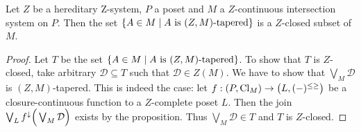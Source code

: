 \begin{corollary} \label{ZMtaperedSetsZclosed}
Let $Z$ be a hereditary $\mathrm{Z}$-system, $P$ a poset and $M$ a $Z$-continuous intersection system on $P$. Then the set $\setbuilder{A\in M}{\text{$A$ is $(Z,M)$-tapered}}$ is a $Z$-closed subset of $M$.
\end{corollary}
\begin{proof}
Let $T$ be the set $\setbuilder{A\in M}{\text{$A$ is $(Z,M)$-tapered}}$. To show that $T$ is $Z$-closed, take arbitrary $\mathcal{D} \subseteq T$ such that $\mathcal{D}\in Z(M)$. We have to show that $\bigvee_{M}\mathcal{D}$ is $(Z,M)$-tapered. This is indeed the case: let $f: \sSet{P, \Closure_M}\to \sSet{L, (-)^{\leq\geq}}$ be a closure-continuous function to a $Z$-complete poset $L$. Then the join $\bigvee_L f^\downarrow\Big(\bigvee_{M}\mathcal{D}\Big)$ exists by the proposition. Thus $\bigvee_{M}\mathcal{D}\in T$ and $T$ is $Z$-closed.
\end{proof}

